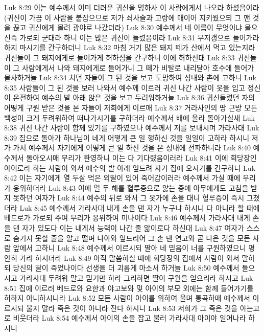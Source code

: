 Luk 8:29  이는 예수께서 이미 더러운 귀신을 명하사 이 사람에게서 나오라 하셨음이라 (귀신이 가끔 이 사람을 붙잡으므로 저가 쇠사슬과 고랑에 매이어 지키웠으되 그 맨 것을 끊고 귀신에게 몰려 광야로 나갔더라)
Luk 8:30  예수께서 네 이름이 무엇이냐 물으신즉 가로되 군대라 하니 이는 많은 귀신이 들렸음이라
Luk 8:31  무저갱으로 들어가라 하지 마시기를 간구하더니
Luk 8:32  마침 거기 많은 돼지 떼가 산에서 먹고 있는지라 귀신들이 그 돼지에게로 들어가게 허하심을 간구하니 이에 허하신대
Luk 8:33  귀신들이 그 사람에게서 나와 돼지에게로 들어가니 그 떼가 비탈로 내리달아 호수에 들어가 몰사하거늘
Luk 8:34  치던 자들이 그 된 것을 보고 도망하여 성내와 촌에 고하니
Luk 8:35  사람들이 그 된 것을 보러 나와서 예수께 이르러 귀신 나간 사람이 옷을 입고 정신이 온전하여 예수의 발 아래 앉은 것을 보고 두려워하거늘
Luk 8:36  귀신들렸던 자의 어떻게 구원 받은 것을 본 자들이 저희에게 이르매
Luk 8:37  거라사인의 땅 근방 모든 백성이 크게 두려워하여 떠나가시기를 구하더라 예수께서 배에 올라 돌아가실새
Luk 8:38  귀신 나간 사람이 함께 있기를 구하였으나 예수께서 저를 보내시며 가라사대
Luk 8:39  집으로 돌아가 하나님이 네게 어떻게 큰 일 행하신 것을 일일이 고하라 하시니 저가 가서 예수께서 자기에게 어떻게 큰 일 하신 것을 온 성내에 전파하니라
Luk 8:40  예수께서 돌아오시매 무리가 환영하니 이는 다 기다렸음이러라
Luk 8:41  이에 회당장인 야이로라 하는 사람이 와서 예수의 발 아래 엎드려 자기 집에 오시기를 간구하니
Luk 8:42  이는 자기에게 열 두살 먹은 외딸이 있어 죽어감이러라 예수께서 가실 때에 무리가 옹위하더라
Luk 8:43  이에 열 두 해를 혈루증으로 앓는 중에 아무에게도 고침을 받지 못하던 여자가
Luk 8:44  예수의 뒤로 와서 그 옷가에 손을 대니 혈루증이 즉시 그쳤더라
Luk 8:45  예수께서 가라사대 내게 손을 댄 자가 누구냐 하시니 다 아니라 할 때에 베드로가 가로되 주여 무리가 옹위하여 미나이다
Luk 8:46  예수께서 가라사대 내게 손을 댄 자가 있도다 이는 내게서 능력이 나간 줄 앎이로다 하신대
Luk 8:47  여자가 스스로 숨기지 못할 줄을 알고 떨며 나아와 엎드리어 그 손 댄 연고와 곧 나은 것을 모든 사람 앞에서 고하니
Luk 8:48  예수께서 이르시되 딸아 네 믿음이 너를 구원하였으니 평안히 가라 하시더라
Luk 8:49  아직 말씀하실 때에 회당장의 집에서 사람이 와서 말하되 당신의 딸이 죽었나이다 선생을 더 괴롭게 마소서 하거늘
Luk 8:50  예수께서 들으시고 가라사대 두려워 말고 믿기만 하라 그리하면 딸이 구원을 얻으리라 하시고
Luk 8:51  집에 이르러 베드로와 요한과 야고보와 및 아이의 부모 외에는 함께 들어가기를 허하지 아니하시니라
Luk 8:52  모든 사람이 아이를 위하여 울며 통곡하매 예수께서 이르시되 울지 말라 죽은 것이 아니라 잔다 하시니
Luk 8:53  저희가 그 죽은 것을 아는고로 비웃더라
Luk 8:54  예수께서 아이의 손을 잡고 불러 가라사대 아이야 일어나라 하시니

